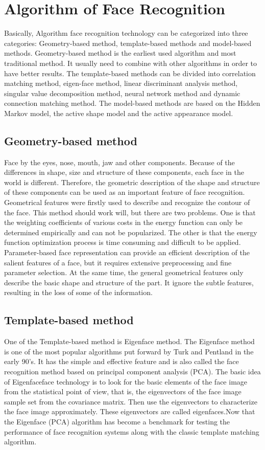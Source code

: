 \documentclass[sigconf]{acmart}
\begin{document}
\section{Algorithm of Face Recognition}
Basically, Algorithm face recognition technology can be categorized into three categories: Geometry-based method, template-based methods and model-based methods. Geometry-based method is the earliest used algorithm and most traditional method. It usually need to combine with other algorithms in order to have better results. The template-based methods can be divided into correlation matching method, eigen-face method, linear discriminant analysis method, singular value decomposition method, neural network method and dynamic connection matching method. The model-based methods are based on the Hidden Markov model, the active shape model and the active appearance model. 

\subsection{Geometry-based method}
Face by the eyes, nose, mouth, jaw and other components. Because of the differences in shape, size and structure of these components, each face in the world is different. Therefore, the geometric description of the shape and structure of these components can be used as an important feature of face recognition. Geometrical features were firstly used to describe and recognize the contour of the face. This method should work will, but there are two problems. One is that the weighting coefficients of various costs in the energy function can only be determined empirically and can not be popularized. The other is that the energy function optimization process is time consuming and difficult to be applied\cite{geo}. Parameter-based face representation can provide an efficient description of the salient features of a face, but it requires extensive preprocessing and fine parameter selection. At the same time, the general geometrical features only describe the basic shape and structure of the part. It ignore the  subtle features, resulting in the loss of some of the information. 

\subsection{Template-based method}
One of the Template-based method is Eigenface method. The Eigenface method is one of the most popular algorithms put forward by Turk and Pentland in the early 90's. It has the simple and effective feature and is also called the face recognition method based on principal component analysis (PCA).
The basic idea of Eigenfaceface technology is to look for the basic elements of the face image  from the statistical point of view, that is, the eigenvectors of the face image sample set from the covariance matrix. Then use the eigenvectors to characterize the face image approximately. These eigenvectors are called eigenfaces.Now that the Eigenface (PCA) algorithm has become a benchmark for testing the performance of face recognition systems along with the classic template matching algorithm\cite{temp}.
\end{document}
